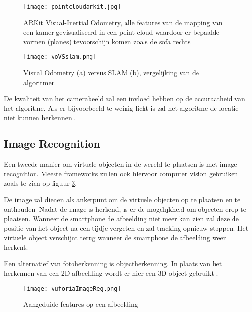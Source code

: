 \begin{figure}
    \texttt{[image: pointcloudarkit.jpg]}
    \caption{ARKit Visual-Inertial Odometry, alle features van de mapping van een kamer gevisualiseerd in een point cloud waardoor er bepaalde vormen (planes) tevoorschijn komen zoals de sofa rechts \autocite{Voloshin2018}}
    \label{fig:pointcloudarkit}
\end{figure}

\begin{figure}
    \texttt{[image: voVSslam.png]}
    \caption{Visual Odometry (a) versus SLAM (b), vergelijking van de algoritmen \autocite{Yousif2015}}
    \label{fig:voVSslam}
\end{figure}


De kwaliteit van het camerabeeld zal een invloed hebben op de accuraatheid van het algoritme. Als er bijvoorbeeld te weinig licht is zal het algoritme de locatie niet kunnen herkennen \autocite{ARKitImages}.

\subsection{Image Recognition}
Een tweede manier om virtuele objecten in de wereld te plaatsen is met image recognition. Meeste frameworks zullen ook hiervoor computer vision gebruiken zoals te zien op figuur \ref{fig:imagereg}.

De image zal dienen als ankerpunt om de virtuele objecten op te plaatsen en te onthouden. 
Nadat de image is herkend, is er de mogelijkheid om objecten erop te plaatsen. Wanneer de smartphone de afbeelding niet meer kan zien zal deze de positie van het object na een tijdje vergeten en zal tracking opnieuw stoppen. Het virtuele object verschijnt terug wanneer de smartphone de afbeelding weer herkent.

Een alternatief van fotoherkenning is objectherkenning. In plaats van het herkennen van een 2D afbeelding wordt er hier een 3D object gebruikt \autocite{VuforiaObject}.

\begin{figure}
    \texttt{[image: vuforiaImageReg.png]}
    \caption{Aangeduide features op een afbeelding \autocite{VuforiaImageTracking}}
    \label{fig:imagereg}
\end{figure}

